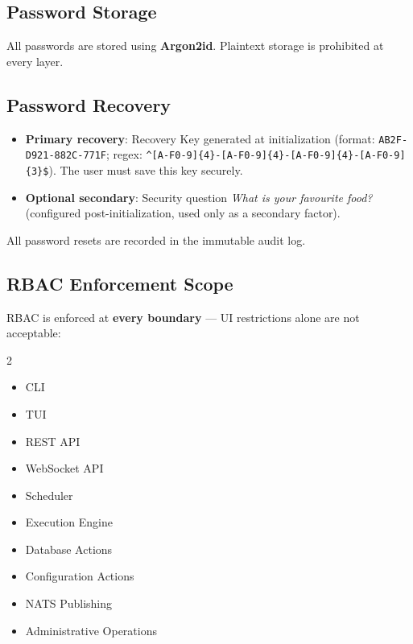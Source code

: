 \documentclass[12pt,a4paper]{article}
\begin{document}
\subsection{Password Storage}

All passwords are stored using \textbf{Argon2id}. Plaintext storage is prohibited at every layer.

\subsection{Password Recovery}

\begin{itemize}[noitemsep]
    \item \textbf{Primary recovery}: Recovery Key generated at initialization (format: \texttt{AB2F-D921-882C-771F}; regex: \texttt{\textasciicircum{}[A-F0-9]\{4\}-[A-F0-9]\{4\}-[A-F0-9]\{4\}-[A-F0-9]\{3\}\$}). The user must save this key securely.
    \item \textbf{Optional secondary}: Security question \textit{What is your favourite food?} (configured post-initialization, used only as a secondary factor).
\end{itemize}

All password resets are recorded in the immutable audit log.

\subsection{RBAC Enforcement Scope}

RBAC is enforced at \textbf{every boundary} — UI restrictions alone are not acceptable:

\begin{multicols}{2}
\begin{itemize}[noitemsep,leftmargin=*]
    \item CLI
    \item TUI
    \item REST API
    \item WebSocket API
    \item Scheduler
    \item Execution Engine
    \item Database Actions
    \item Configuration Actions
    \item NATS Publishing
    \item Administrative Operations
\end{itemize}
\end{multicols}
\end{document}
